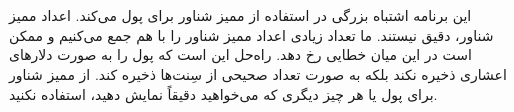 \section{}
\paragraph{}\label{answer:107}
این برنامه اشتباه بزرگی در استفاده از ممیز شناور برای پول می‌کند. اعداد ممیز شناور، دقیق نیستند. ما تعداد زیادی اعداد ممیز شناور را با هم جمع می‌کنیم و ممکن است در این میان خطایی رخ دهد. راه‌حل این است که پول را به صورت دلارهای اعشاری ذخیره نکند بلکه به صورت تعداد صحیحی از سِنت‌ها ذخیره کند. از ممیز شناور برای پول یا هر چیز دیگری که می‌خواهید دقیقاً نمایش دهید، استفاده نکنید.
